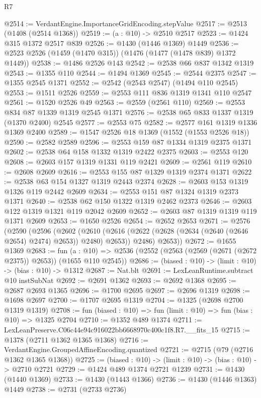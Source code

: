 \begin{lexlean}{R7}
\begin{coremodule}
@2514 := VerdantEngine.ImportanceGridEncoding.stepValue
@2517 := @2513 (@1408 (@2514 @1368))
@2519 := (a : @10) -> @2510 @2517
@2523 := @1424 @315 @1372 @2517 @839
@2526 := @1430 (@1446 @1369) @1449
@2536 := @2523 @2526 (@1459 (@1470 @315)) (@1476 (@1477 (@1478 @839) @1372 @1449))
@2538 := @1486 @2526 @143
@2542 := @2538 @66 @837 @1342 @1319
@2543 := @1355 @110
@2544 := @1494 @1369
@2545 := @2544 @2375
@2547 := @1355 @2545 @1371
@2552 := @2542 (@2543 @2547) (@1494 @110 @2545)
@2553 := @1511 @2526
@2559 := @2553 @111 @836 @1319 @1341 @110 @2547
@2561 := @1520 @2526 @49
@2563 := @2559 (@2561 @110)
@2569 := @2553 @834 @87 @1339 @1319 @2545 @1371
@2576 := @2538 @65 @833 @1337 @1319 (@1370 @2400) @2545
@2577 := @2553 @75
@2582 := @2577 @161 @1319 @1336 @1369 @2400
@2589 := @1547 @2526 @18 @1369 (@1552 (@1553 @2526 @18))
@2590 := @2582 @2589
@2596 := @2553 @159 @87 @1334 @1319 @2375 @1371
@2602 := @2538 @64 @158 @1332 @1319 @2422 @2375
@2603 := @2553 @120
@2608 := @2603 @157 @1319 @1331 @119 @2421
@2609 := @2561 @119
@2610 := @2608 @2609
@2616 := @2553 @155 @87 @1329 @1319 @2374 @1371
@2622 := @2538 @63 @154 @1327 @1319 @2443 @2374
@2628 := @2603 @153 @1319 @1326 @119 @2442 @2609
@2634 := @2553 @151 @87 @1324 @1319 @2373 @1371
@2640 := @2538 @62 @150 @1322 @1319 @2462 @2373
@2646 := @2603 @122 @1319 @1321 @119 @2042 @2609
@2652 := @2603 @87 @1319 @1319 @119 @1371 @2609
@2653 := @1650 @2526
@2654 := @2652 @2653
@2671 := @2576
    (@2590
      (@2596
        (@2602
          (@2610 (@2616 (@2622 (@2628 (@2634 (@2640 (@2646 @2654) @2474) @2653)) @2480) @2653))
          @2486)
        @2653))
@2672 := @1655 @1369
@2683 := fun (a : @10) =>
  @2536 (@2552 (@2563 (@2569 (@2671 (@2672 @2375)) @2653)) (@1655 @110 @2545))
@2686 := (biased : @10) -> (limit : @10) -> (bias : @10) -> @1312
@2687 := Nat.blt
@2691 := LexLeanRuntime.subtract @10 instSubNat
@2692 := @2691 @1362
@2693 := @2692 @1368
@2695 := @2687 @2693 @1365
@2696 := @1700 @2695
@2697 := @2696 @1319
@2698 := @1698 @2697
@2700 := @1707 @2695 @1319
@2704 := @1325 (@2698 @2700 @1319 @1319)
@2708 := fun (biased : @10) => fun (limit : @10) => fun (bias : @10) => @1325 @2704
@2710 := @1352 @489 @1374
@2711 := LexLeanPreserve.C06c44e94c916022bb6668970c400c1f8.R7.__fits_15
@2715 := @1378 (@2711 @1362 @1365 @1368)
@2716 := VerdantEngine.GroupedAffineEncoding.quantized
@2721 := @2715 (@79 (@2716 @1362 @1365 @1368))
@2725 := (biased : @10) -> (limit : @10) -> (bias : @10) -> @2710 @2721
@2729 := @1424 @489 @1374 @2721 @1239
@2731 := @1430 (@1440 @1369)
@2733 := @1430 (@1443 @1366)
@2736 := @1430 (@1446 @1363) @1449
@2738 := @2731 (@2733 @2736)

\end{coremodule}
\end{lexlean}
